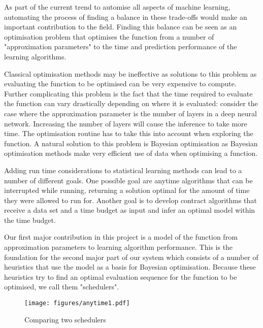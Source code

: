 \documentclass[a4paper,12pt,twoside,openright]{report}
\begin{document}
As part of the current trend to automise all aspects of machine learning, automating the process of finding a balance in these trade-offs would make an important contribution to the field. Finding this balance can be seen as an optimisation problem that optimises the function from a number of "approximation parameters" to the time and prediction performance of the learning algorithms. 

Classical optimisation methods may be ineffective as solutions to this problem as evaluating the function to be optimised can be very expensive to compute. Further complicating this problem is the fact that the time required to evaluate the function can vary drastically depending on where it is evaluated: consider the case where the approximation parameter is the number of layers in a deep neural network. Increasing the number of layers will cause the inference to take more time. The optimisation routine has to take this into account when exploring the function. A natural solution to this problem is Bayesian optimisation as Bayesian optimisation methods make very efficient use of data when optimising a function.

Adding run time considerations to statistical learning methods can lead to a number of different goals. One possible goal are anytime algorithms that can be interrupted while running, returning a solution optimal for the amount of time they were allowed to run for. Another goal is to develop contract algorithms that receive a data set and a time budget as input and infer an optimal model within the time budget.


Our first major contribution in this project is a model of the function from approximation parameters to learning algorithm performance. This is the foundation for the second major part of our system which consists of a number of heuristics that use the model as a basis for Bayesian optimisation. Because these heuristics try to find an optimal evaluation sequence for the function to be optimised, we call them "schedulers".

\begin{figure}
\centering
  \texttt{[image: figures/anytime1.pdf]}
  \caption{Comparing two schedulers}
  \label{anytime1}
\end{figure}
\end{document}
